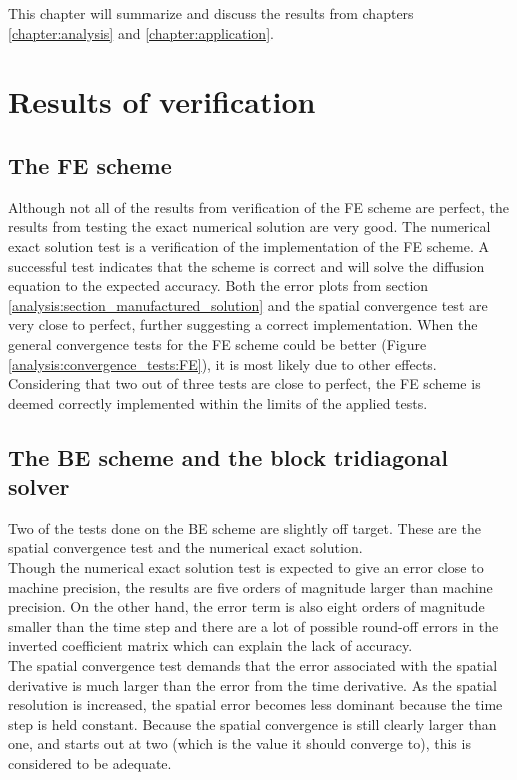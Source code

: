 \noindent This chapter will summarize and discuss the results from chapters \ref{chapter:analysis} and \ref{chapter:application}.

\section{Results of verification}


\subsection{The FE scheme}
Although not all of the results from verification of the FE scheme are perfect, the results from testing the exact numerical solution are very good. 
The numerical exact solution test is a verification of the implementation of the FE scheme. 
A successful test indicates that the scheme is correct and will solve the diffusion equation to the expected accuracy. 
Both the error plots from section \ref{analysis:section_manufactured_solution} and the spatial convergence test are very close to perfect, further suggesting a correct implementation. 
When the general convergence tests for the FE scheme could be better (Figure \ref{analysis:convergence_tests:FE}), it is most likely due to other effects. \\
Considering that two out of three tests are close to perfect, the FE scheme is deemed correctly implemented within the limits of the applied tests.

\subsection{The BE scheme and the block tridiagonal solver}
Two of the tests done on the BE scheme are slightly off target. 
These are the spatial convergence test and the numerical exact solution. \\
Though the numerical exact solution test is expected to give an error close to machine precision, the results are five orders of magnitude larger than machine precision. 
On the other hand, the error term is also eight orders of magnitude smaller than the time step and there are a lot of possible round-off errors in the inverted coefficient matrix which can explain the lack of accuracy. \\
The spatial convergence test demands that the error associated with the spatial derivative is much larger than the error from the time derivative. 
As the spatial resolution is increased, the spatial error becomes less dominant because the time step is held constant. 
Because the spatial convergence is still clearly larger than one, and starts out at two (which is the value it should converge to), this is considered to be adequate. \\

